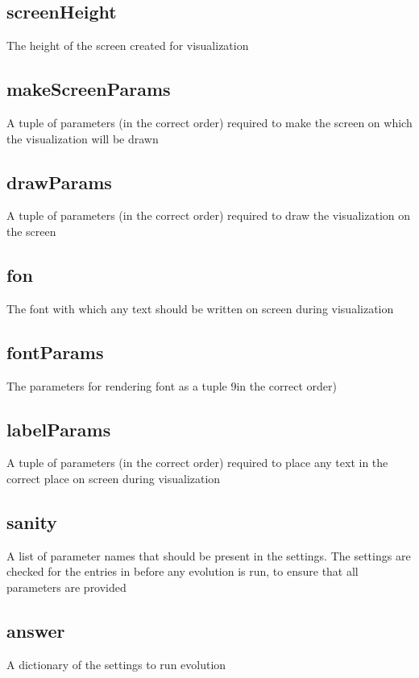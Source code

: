 \documentclass[letterpaper,10pt,english]{sphinxmanual}
\begin{document}
\subsection{screenHeight}
\label{settings.py:screenheight}
The height of the screen created for visualization


\subsection{makeScreenParams}
\label{settings.py:makescreenparams}
A tuple of parameters (in the correct order) required to make the screen on which the visualization will be drawn


\subsection{drawParams}
\label{settings.py:drawparams}
A tuple of parameters (in the correct order) required to draw the visualization on the screen


\subsection{fon}
\label{settings.py:fon}
The font with which any text should be written on screen during visualization


\subsection{fontParams}
\label{settings.py:fontparams}
The parameters for rendering font as a tuple 9in the correct order)


\subsection{labelParams}
\label{settings.py:labelparams}
A tuple of parameters (in the correct order) required to place any text in the correct place on screen during visualization


\subsection{sanity}
\label{settings.py:sanity}
A list of parameter names that should be present in the settings.
The settings are checked for the entries in  before any evolution is run, to ensure that all parameters are provided


\subsection{answer}
\label{settings.py:answer}
A dictionary of the settings to run evolution
\end{document}
